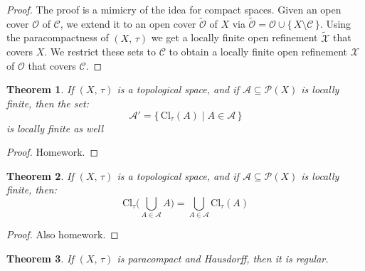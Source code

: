 \documentclass{article}
\theoremstyle{plain}
\newtheorem{theorem}{Theorem}[section]
\theoremstyle{normal}
\begin{document}
        \begin{proof}
            The proof is a mimicry of the idea for compact spaces. Given an
            open cover $\mathcal{O}$ of $\mathcal{C}$, we extend it to an open
            cover $\tilde{\mathcal{O}}$ of $X$ via
            $\tilde{\mathcal{O}}=\mathcal{O}\cup\{\,X\setminus\mathcal{C}\,\}$.
            Using the paracompactness of $(X,\,\tau)$
            we get a locally finite open
            refinement $\tilde{\mathcal{X}}$ that covers $X$. We restrict these
            sets to $\mathcal{C}$ to obtain a locally finite open refinement
            $\mathcal{X}$ of $\mathcal{O}$ that covers $\mathcal{C}$.
        \end{proof}
        \begin{theorem}
            If $(X,\,\tau)$ is a topological space, and if
            $\mathcal{A}\subseteq\mathcal{P}(X)$ is locally finite, then the
            set:
            \begin{equation}
                \mathcal{A}'=\{\,\textrm{Cl}_{\tau}(A)\;|\;A\in\mathcal{A}\,\}
            \end{equation}
            is locally finite as well
        \end{theorem}
        \begin{proof}
            Homework.
        \end{proof}
        \begin{theorem}
            If $(X,\,\tau)$ is a topological space, and if
            $\mathcal{A}\subseteq\mathcal{P}(X)$ is locally finite, then:
            \begin{equation}
                \textrm{Cl}_{\tau}\Big(\bigcup_{A\in\mathcal{A}}A\big)
                =\bigcup_{A\in\mathcal{A}}\textrm{Cl}_{\tau}(A)
            \end{equation}
        \end{theorem}
        \begin{proof}
            Also homework.
        \end{proof}
        \begin{theorem}
            If $(X,\,\tau)$ is paracompact and Hausdorff, then it is regular.
        \end{theorem}
\end{document}
